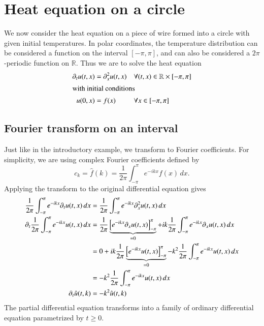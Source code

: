 %
%
%
\section{Heat equation on a circle}
We now consider the heat equation on a piece of wire formed into
a circle with given initial temperatures.
In polar coordinates, the temperature distribution can be considered
a function on the interval $[-\pi,\pi]$, and can also be considered
a $2\pi$-periodic function on $\mathbb R$.
Thus we are to solve the heat equation
\begin{align*}
\partial_t u(t,x)&=\partial_x^2 u(t,x) &&\forall(t,x)\in\mathbb R\times[-\pi,\pi]\\
\intertext{with initial conditions}
u(0,x)&=f(x)&& \forall x\in[-\pi,\pi]\\
\end{align*}

\subsection{Fourier transform on an interval}
Just like in the introductory example, we transform to Fourier coefficients.
For simplicity, we are using complex Fourier coefficients defined by
\[
c_k=\hat f(k)=\frac1{2\pi}\int_{-\pi}^{\pi}e^{-ikx}f(x)\,dx.
\]
Applying the transform to the original differential equation gives
\begin{align}
\frac1{2\pi}\int_{-\pi}^{\pi}e^{-ikx}\partial_t u(t,x)\,dx
&=\frac1{2\pi}\int_{-\pi}^{\pi}e^{-ikx}\partial_x^2 u(t,x)\,dx
\notag
\\
\partial_t\frac1{2\pi}\int_{-\pi}^{\pi}e^{-ikx} u(t,x)\,dx
&=
\frac1{2\pi}
\underbrace{
\left[
e^{-ikx}\partial_x u(t,x)
\right]_{-\pi}^{\pi}}_{=0}
+
ik\frac1{2\pi}\int_{-\pi}^{\pi}e^{-ikx}\partial_x u(t,x)\,dx
\notag
\\
&=
0 + 
ik\frac1{2\pi}
\underbrace{
\left[
e^{-ikx}u(t,x)
\right]_{-\pi}^{\pi}}_{=0}
-
k^2\frac1{2\pi}\int_{-\pi}^{\pi}e^{-ikx} u(t,x)\,dx
\notag
\\
&=
-
k^2\frac1{2\pi}\int_{-\pi}^{\pi}e^{-ikx} u(t,x)\,dx
\notag
\\
\partial_t\hat u(t,k)&=-k^2 \hat u(t,k)
\label{fouriertransformiert}
\end{align}
The partial differential equation transforms into a family of ordinary
differential equation parametrized by $t\ge 0$.

